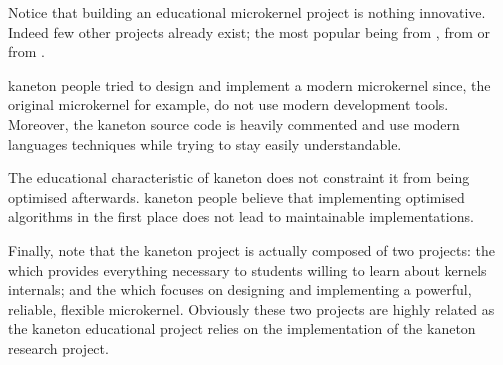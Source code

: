 Notice that building an educational microkernel project is nothing innovative.
Indeed few other projects already exist; the most popular being 
from ,  from 
or  from .

kaneton people tried to design and implement a modern microkernel since, the
original  microkernel for example, do not use modern development
tools. Moreover, the kaneton source code is heavily commented and use modern
languages techniques while trying to stay easily understandable.

The educational characteristic of kaneton does not constraint it from being
optimised afterwards. kaneton people believe that implementing optimised
algorithms in the first place does not lead to maintainable implementations.

Finally, note that the kaneton project is actually composed of two projects:
the  which provides
everything necessary to students willing to learn about kernels internals;
and the  which focuses on
designing and implementing a powerful, reliable, flexible microkernel.
Obviously these two projects are highly related as the kaneton educational
project relies on the implementation of the kaneton research project.
